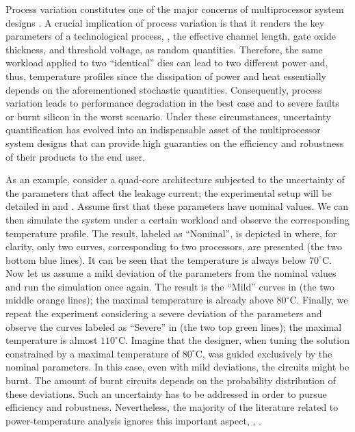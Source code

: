 Process variation constitutes one of the major concerns of multiprocessor system designs \cite{chandrakasan2001, srivastava2010}.
A crucial implication of process variation is that it renders the key parameters of a technological process, \eg, the effective channel length, gate oxide thickness, and threshold voltage, as random quantities.
Therefore, the same workload applied to two ``identical'' dies can lead to two different power and, thus, temperature profiles since the dissipation of power and heat essentially depends on the aforementioned stochastic quantities.
Consequently, process variation leads to performance degradation in the best case and to severe faults or burnt silicon in the worst scenario.
Under these circumstances, uncertainty quantification \cite{xiu2010, maitre2010} has evolved into an indispensable asset of the multiprocessor system designs that can provide high guaranties on the efficiency and robustness of their products to the end user.


As an example, consider a quad-core architecture subjected to the uncertainty of the parameters that affect the leakage current; the experimental setup will be detailed in  and .
Assume first that these parameters have nominal values. We can then simulate the system under a certain workload and observe the corresponding temperature profile.
The result, labeled as ``Nominal'', is depicted in  where, for clarity, only two curves, corresponding to two processors, are presented (the two bottom blue lines). It can be seen that the temperature is always below $70^{\circ}$C.
Now let us assume a mild deviation of the parameters from the nominal values and run the simulation once again. The result is the ``Mild'' curves in  (the two middle orange lines); the maximal temperature is already above $80^{\circ}$C.
Finally, we repeat the experiment considering a severe deviation of the parameters and observe the curves labeled as ``Severe'' in  (the two top green lines); the maximal temperature is almost $110^{\circ}$C.
Imagine that the designer, when tuning the solution constrained by a maximal temperature of $80^\circ$C, was guided exclusively by the nominal parameters. In this case, even with mild deviations, the circuits might be burnt.
The amount of burnt circuits depends on the probability distribution of these deviations.
Such an uncertainty has to be addressed in order to pursue efficiency and robustness.
Nevertheless, the majority of the literature related to power-temperature analysis ignores this important aspect, \eg, \cite{rao2009, rai2011, thiele2011, ukhov2012}.

